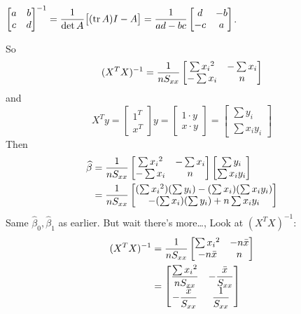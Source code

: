 \recall* $\displaystyle \begin{bmatrix}
    a & b \\ c & d
\end{bmatrix}^{-1} = \over*{\det A} \bigbrac{(\operatorname{tr}A)I - A} = \over{ad-bc} \begin{bmatrix}
    d & -b\\ -c & a
\end{bmatrix}$.

\nl So $$\displaystyle (X^TX)^{-1} = \over{nS_{xx}} \begin{bmatrix}
    \sum {x_i}^2 & - \sum x_i \\  - \sum x_i & n
\end{bmatrix} $$
and
$$X^T y = \begin{bmatrix}
    1^T \\ x^T
\end{bmatrix} y = \begin{bmatrix}
    1 \cdot y \\ x \cdot y
\end{bmatrix} = \begin{bmatrix}
    \sum y_i\\ \sum x_i y_i
\end{bmatrix}$$
Then
\begin{align*}
    \widehat{\beta} &= \over{nS_{xx}} \begin{bmatrix}
        \sum {x_i}^2 & - \sum x_i\\ -\sum x_i & n
    \end{bmatrix} \begin{bmatrix}
        \sum y_i \\ \sum x_i y_i
    \end{bmatrix}
    \\
    &= \over{n S_{xx}} \begin{bmatrix}
        (\sum {x_i}^2)(\sum y_i) - (\sum x_i)(\sum x_i y_i)\\
        -(\sum x_i)(\sum y_i) + n \sum x_i y_i
    \end{bmatrix}
\end{align*}
Same $\widehat{\beta}_0, \widehat{\beta}_1$ as earlier. But wait there's more\dots, Look at $(X^TX)^{-1}$:
\begin{align*}
    (X^TX)^{-1} &= \over{nS_{xx}} \begin{bmatrix}
        \sum {x_i}^2 & -n \bar x\\ -n \bar x & n
    \end{bmatrix}\\
    &= \begin{bmatrix}
        \dfrac{\sum {x_i}^2}{n S_{xx}} & -\dfrac{\bar x}{S_{xx}}\\ -\dfrac{\bar x}{S_{xx}} & \dfrac{1}{S_{xx}}
    \end{bmatrix}
\end{align*}
